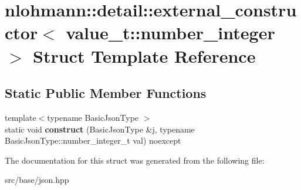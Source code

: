 \hypertarget{structnlohmann_1_1detail_1_1external__constructor_3_01value__t_1_1number__integer_01_4}{}\section{nlohmann\+:\+:detail\+:\+:external\+\_\+constructor$<$ value\+\_\+t\+:\+:number\+\_\+integer $>$ Struct Template Reference}
\label{structnlohmann_1_1detail_1_1external__constructor_3_01value__t_1_1number__integer_01_4}
\subsection*{Static Public Member Functions}
\begin{DoxyCompactItemize}
\item 
\mbox{\label{structnlohmann_1_1detail_1_1external__constructor_3_01value__t_1_1number__integer_01_4_a7c3949672ddb45095cc2527635feef0b}} 
{\footnotesize template$<$typename Basic\+Json\+Type $>$ }\\static void {\bfseries construct} (Basic\+Json\+Type \&j, typename Basic\+Json\+Type\+::number\+\_\+integer\+\_\+t val) noexcept
\end{DoxyCompactItemize}


The documentation for this struct was generated from the following file\+:\begin{DoxyCompactItemize}
\item 
src/base/json.\+hpp\end{DoxyCompactItemize}
